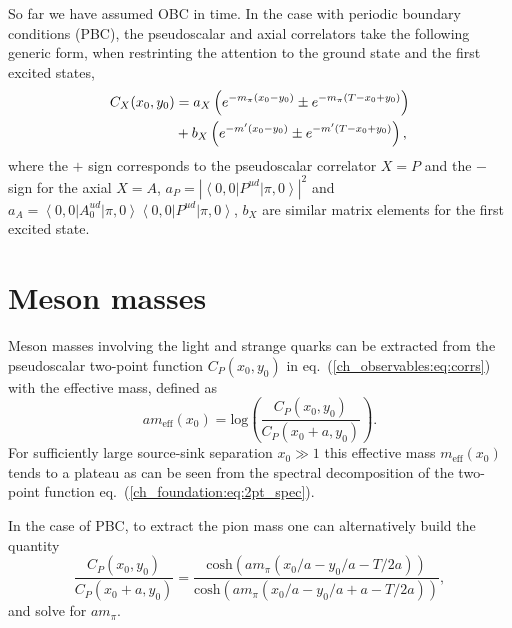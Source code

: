 So far we have assumed OBC in time. In the case with periodic boundary conditions (PBC), the pseudoscalar and axial correlators take the following generic form, when restrinting the attention to the ground state and the first excited states,
\begin{align}
\label{ch_observables:eq:corrs_PBC}
C_X(x_0,y_0)&=a_X\left(e^{-m_{\pi}(x_0-y_0)}\pm e^{-m_{\pi}(T-x_0+y_0)}\right) \notag \\
&+b_X\left(e^{-m'(x_0-y_0)}\pm e^{-m'(T-x_0+y_0)}\right),
\end{align}
where the $+$ sign corresponds to the pseudoscalar correlator $X=P$ and the $-$ sign for the axial $X=A$,  $a_P=|\left<0,0\right|P^{ud}\left|\pi,0\right>|^2$ and $a_A=\left<0,0\right|A_0^{ud}\left|\pi,0\right>\left<0,0\right|P^{ud}\left|\pi,0\right>$, $b_X$ are similar matrix elements for the first excited state. 


\section{Meson masses}
\label{ch_observables:sec:meson_mass}

Meson masses involving the light and strange quarks can be extracted from the pseudoscalar two-point function $C_P(x_0,y_0)$ in eq.~(\ref{ch_observables:eq:corrs}) with the effective mass, defined as
\begin{equation}
\label{ch_observables:eq:meff}
am_{\textrm{eff}}(x_0)={\textrm{log}}\left(\frac{C_P(x_0,y_0)}{C_P(x_0+a,y_0)}\right).
\end{equation}
For sufficiently large source-sink separation $x_0\gg 1$ this effective mass $m_{\textrm{eff}}(x_0)$ tends to a plateau as can be seen from the spectral decomposition of the two-point function eq.~(\ref{ch_foundation:eq:2pt_spec}).

In the case of PBC, to extract the pion mass one can alternatively build the quantity
\begin{equation}
\label{ch_observables:eq:meff_PBC}
\frac{C_P(x_0,y_0)}{C_P(x_0+a,y_0)}=\frac{{\textrm{cosh}}(am_{\pi}(x_0/a-y_0/a-T/2a))}{{\textrm{cosh}}(am_{\pi}(x_0/a-y_0/a+a-T/2a))},
\end{equation}
and solve for $am_{\pi}$.

